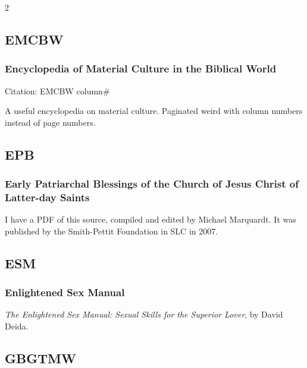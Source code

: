\begin{multicols}{2}
	\subsection*{EMCBW}
	
		\subsubsection*{Encyclopedia of Material Culture in the Biblical World}
		
			Citation:
				EMCBW column\#
				
			A useful encyclopedia on material culture. Paginated weird with column numbers instead of page numbers.

	\subsection*{EPB}
	
		\subsubsection*{Early Patriarchal Blessings of the Church of Jesus Christ of Latter-day Saints}
		
			I have a PDF of this source, compiled and edited by Michael Marquardt. It was published by the Smith-Pettit Foundation in SLC in 2007.
			
	\subsection*{ESM}
	
		\subsubsection*{Enlightened Sex Manual}
		
			\textit{The Enlightened Sex Manual: Sexual Skills for the Superior Lover}, by David Deida.
			
	\subsection*{GBGTMW}
	

\end{multicols}
